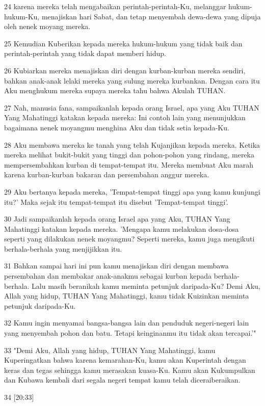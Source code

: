 \par 24 karena mereka telah mengabaikan perintah-perintah-Ku, melanggar hukum-hukum-Ku, menajiskan hari Sabat, dan tetap menyembah dewa-dewa yang dipuja oleh nenek moyang mereka.
\par 25 Kemudian Kuberikan kepada mereka hukum-hukum yang tidak baik dan perintah-perintah yang tidak dapat memberi hidup.
\par 26 Kubiarkan mereka menajiskan diri dengan kurban-kurban mereka sendiri, bahkan anak-anak lelaki mereka yang sulung mereka kurbankan. Dengan cara itu Aku menghukum mereka supaya mereka tahu bahwa Akulah TUHAN.
\par 27 Nah, manusia fana, sampaikanlah kepada orang Israel, apa yang Aku TUHAN Yang Mahatinggi katakan kepada mereka: Ini contoh lain yang menunjukkan bagaimana nenek moyangmu menghina Aku dan tidak setia kepada-Ku.
\par 28 Aku membawa mereka ke tanah yang telah Kujanjikan kepada mereka. Ketika mereka melihat bukit-bukit yang tinggi dan pohon-pohon yang rindang, mereka mempersembahkan kurban di tempat-tempat itu. Mereka membuat Aku marah karena kurban-kurban bakaran dan persembahan anggur mereka.
\par 29 Aku bertanya kepada mereka, 'Tempat-tempat tinggi apa yang kamu kunjungi itu?' Maka sejak itu tempat-tempat itu disebut 'Tempat-tempat tinggi'.
\par 30 Jadi sampaikanlah kepada orang Israel apa yang Aku, TUHAN Yang Mahatinggi katakan kepada mereka. 'Mengapa kamu melakukan dosa-dosa seperti yang dilakukan nenek moyangmu? Seperti mereka, kamu juga mengikuti berhala-berhala yang menjijikkan itu.
\par 31 Bahkan sampai hari ini pun kamu menajiskan diri dengan membawa persembahan dan membakar anak-anakmu sebagai kurban kepada berhala-berhala. Lalu masih beranikah kamu meminta petunjuk daripada-Ku? Demi Aku, Allah yang hidup, TUHAN Yang Mahatinggi, kamu tidak Kuizinkan meminta petunjuk daripada-Ku.
\par 32 Kamu ingin menyamai bangsa-bangsa lain dan penduduk negeri-negeri lain yang menyembah pohon dan batu. Tetapi keinginanmu itu tidak akan tercapai.'"
\par 33 "Demi Aku, Allah yang hidup, TUHAN Yang Mahatinggi, kamu Kuperingatkan bahwa karena kemarahan-Ku, kamu akan Kuperintah dengan keras dan tegas sehingga kamu merasakan kuasa-Ku. Kamu akan Kukumpulkan dan Kubawa kembali dari segala negeri tempat kamu telah diceraiberaikan.
\par 34 [20:33]
